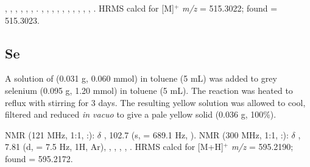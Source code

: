 ,
,
,
,
,
,
.
,
,
,
,
,
,
,
,
,
,
.
HRMS calcd for  [M]$^+$ \emph{m/z} = 515.3022; found = 515.3023.


\subsection*{\tBuSixantphos Se}


A solution of \tBuxantphos{} (0.031 g, 0.060 mmol) in toluene (5 mL) was added to grey selenium (0.095 g, 1.20 mmol) in toluene (5 mL).  The reaction was heated to reflux with stirring for 3 days.  The resulting yellow solution was allowed to cool, filtered and reduced \emph{in vacuo} to give a pale yellow solid (0.036 g, 100\%).

\phosphorus{} NMR (121 MHz, 1:1, :): $\delta$
,
102.7 (s, \JPSe{} = 689.1 Hz, ).
\proton{} NMR (300 MHz, 1:1, :): $\delta$
,
7.81 (d, \J{} = 7.5 Hz, 1H, Ar),
,
,
,
,
.
HRMS calcd for  [M+H]$^+$ \emph{m/z} = 595.2190; found = 595.2172.

